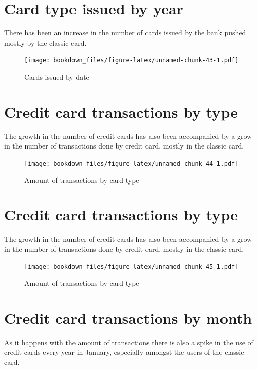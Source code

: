\documentclass[]{book}
\begin{document}
\section{Card type issued by year}\label{card-type-issued-by-year}

There has been an increase in the number of cards issued by the bank
pushed mostly by the classic card.

\begin{figure}
\centering
\texttt{[image: bookdown\_files/figure-latex/unnamed-chunk-43-1.pdf]}
\caption{\label{fig:unnamed-chunk-43}Cards issued by date}
\end{figure}

\section{Credit card transactions by
type}\label{credit-card-transactions-by-type}

The growth in the number of credit cards has also been accompanied by a
grow in the number of transactions done by credit card, mostly in the
classic card.

\begin{figure}
\centering
\texttt{[image: bookdown\_files/figure-latex/unnamed-chunk-44-1.pdf]}
\caption{\label{fig:unnamed-chunk-44}Amount of transactions by card type}
\end{figure}

\section{Credit card transactions by
type}\label{credit-card-transactions-by-type-1}

The growth in the number of credit cards has also been accompanied by a
grow in the number of transactions done by credit card, mostly in the
classic card.

\begin{figure}
\centering
\texttt{[image: bookdown\_files/figure-latex/unnamed-chunk-45-1.pdf]}
\caption{\label{fig:unnamed-chunk-45}Amount of transactions by card type}
\end{figure}

\section{Credit card transactions by
month}\label{credit-card-transactions-by-month}

As it happens with the amount of transactions there is also a spike in
the use of credit cards every year in January, especially amongst the
users of the classic card.
\end{document}
